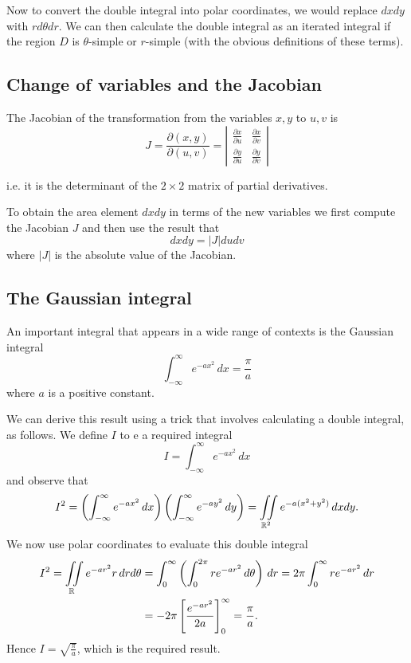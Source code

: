 \documentclass[10pt, a4paper]{article}
\begin{document}
Now to convert the double integral into polar coordinates,
we would replace $dxdy$ with $rd\theta dr$.
We can then calculate the double integral as an iterated integral if the region $D$ is $\theta$-simple or $r$-simple
(with the obvious definitions of these terms).

\subsection{Change of variables and the Jacobian}
\begin{definition}
    The Jacobian of the transformation from the variables $x, y$ to $u, v$ is
    \[
    J = \frac{\partial(x, y)}{\partial(u, v)} = \left|\begin{array}{cc}
        \frac{\partial x}{\partial u} & \frac{\partial x}{\partial v} \\
        \frac{\partial y}{\partial u} & \frac{\partial y}{\partial v} 
    \end{array}\right|
    \]
\end{definition}
i.e. it is the determinant of the $2 \times 2$ matrix of partial derivatives.

To obtain the area element $dxdy$ in terms of the new variables we first compute the Jacobian $J$ and then use the result that
\[
dxdy = |J|dudv
\]
where $|J|$ is the absolute value of the Jacobian.

\subsection{The Gaussian integral}
An important integral that appears in a wide range of contexts is the Gaussian integral
\[
\int_{-\infty}^{\infty}e ^ {-ax ^ 2}\,dx = \frac{\pi}{a}
\]
where $a$ is a positive constant.

We can derive this result using a trick that involves calculating a double integral,
as follows.
We define $I$ to e a required integral
\[
I = \int_{-\infty}^{\infty}e ^ {-ax ^ 2}\,dx
\]
and observe that
\[
I ^ 2 = \left(\int_{-\infty}^{\infty}e ^ {-ax ^ 2}\,dx\right)\left(\int_{-\infty}^{\infty}e ^ {-ay ^ 2}\,dy\right) = \iint\limits_{\mathbb{R} ^ 2}e ^ {-a(x ^ 2 + y ^ 2)}\,dxdy.
\]
We now use polar coordinates to evaluate this double integral
\begin{align*}
    I ^ 2 = \iint\limits_{\mathbb{R}}e ^ {-ar ^ 2}r\,drd\theta &= \int_0^{\infty}\left(\int_0^{2\pi}re ^ {-ar ^ 2}\,d\theta\right)\,dr = 2\pi\int_0^{\infty}re ^ {-ar ^ 2}\,dr \\
    &= -2\pi\left[\frac{e ^ {-ar ^ 2}}{2a}\right]_0^{\infty} = \frac{\pi}{a}.
\end{align*}
Hence $I = \sqrt{\frac{\pi}{a}}$,
which is the required result.
\end{document}
